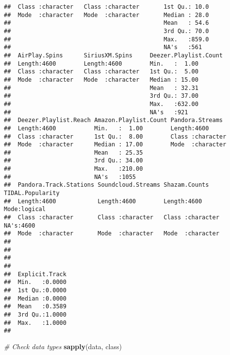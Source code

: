 \documentclass[
]{article}
\newenvironment{Shaded}{\begin{snugshade}}{\end{snugshade}}
\newcommand{\CommentTok}[1]{\textcolor[rgb]{0.56,0.35,0.01}{\textit{#1}}}
\newcommand{\FunctionTok}[1]{\textcolor[rgb]{0.13,0.29,0.53}{\textbf{#1}}}
\newcommand{\NormalTok}[1]{#1}
\begin{document}
\begin{verbatim}
##  Class :character   Class :character       1st Qu.: 10.0             
##  Mode  :character   Mode  :character       Median : 28.0             
##                                            Mean   : 54.6             
##                                            3rd Qu.: 70.0             
##                                            Max.   :859.0             
##                                            NA's   :561               
##  AirPlay.Spins      SiriusXM.Spins     Deezer.Playlist.Count
##  Length:4600        Length:4600        Min.   :  1.00       
##  Class :character   Class :character   1st Qu.:  5.00       
##  Mode  :character   Mode  :character   Median : 15.00       
##                                        Mean   : 32.31       
##                                        3rd Qu.: 37.00       
##                                        Max.   :632.00       
##                                        NA's   :921          
##  Deezer.Playlist.Reach Amazon.Playlist.Count Pandora.Streams   
##  Length:4600           Min.   :  1.00        Length:4600       
##  Class :character      1st Qu.:  8.00        Class :character  
##  Mode  :character      Median : 17.00        Mode  :character  
##                        Mean   : 25.35                          
##                        3rd Qu.: 34.00                          
##                        Max.   :210.00                          
##                        NA's   :1055                            
##  Pandora.Track.Stations Soundcloud.Streams Shazam.Counts      TIDAL.Popularity
##  Length:4600            Length:4600        Length:4600        Mode:logical    
##  Class :character       Class :character   Class :character   NA's:4600       
##  Mode  :character       Mode  :character   Mode  :character                   
##                                                                               
##                                                                               
##                                                                               
##                                                                               
##  Explicit.Track  
##  Min.   :0.0000  
##  1st Qu.:0.0000  
##  Median :0.0000  
##  Mean   :0.3589  
##  3rd Qu.:1.0000  
##  Max.   :1.0000  
## 
\end{verbatim}

\begin{Shaded}
\begin{Highlighting}[]
\CommentTok{\# Check data types}
\FunctionTok{sapply}\NormalTok{(data, class)}
\end{Highlighting}
\end{Shaded}
\end{document}
